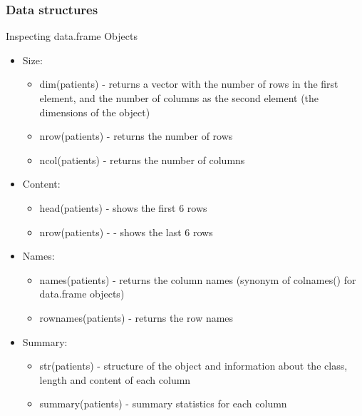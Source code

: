 \documentclass{beamer}
\begin{document}
\begin{frame}[fragile]
	\frametitle{Data structures}
	\centering \LARGE Inspecting data.frame Objects
	\begin{itemize}
		\normalsize
		\item Size:
			\begin{itemize}
					\scriptsize
				\item {\ttfamily dim(patients)} - returns a vector with the number of rows in the first element, and the number of columns as the second element (the dimensions of the object)
				\item {\ttfamily nrow(patients)} - returns the number of rows
				\item {\ttfamily ncol(patients)} - returns the number of columns
			\end{itemize}
		\normalsize
		\item Content:
			\begin{itemize}
					\scriptsize
				\item {\ttfamily head(patients)} - shows the first 6 rows
				\item {\ttfamily nrow(patients)} - - shows the last 6 rows
			\end{itemize}
		\normalsize
		\item Names:
			\begin{itemize}
					\scriptsize
				\item {\ttfamily names(patients)} - returns the column names (synonym of colnames() for  data.frame objects)
				\item {\ttfamily rownames(patients)} - returns the row names
			\end{itemize}
	\normalsize
	\item Summary:
		\begin{itemize}
					\scriptsize
				\item {\ttfamily str(patients)} - structure of the object and information about the class, length and content of each column
				\item {\ttfamily summary(patients)} - summary statistics for each column
			\end{itemize}
	\end{itemize}
\end{frame}
\end{document}
